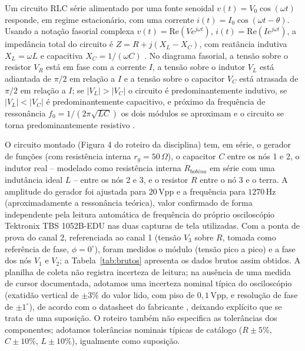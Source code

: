 \documentclass[12pt]{article}
\begin{document}
Um circuito RLC série alimentado por uma fonte senoidal $v(t)=V_0\cos(\omega t)$ responde, em regime estacionário, com uma corrente $i(t)=I_0\cos(\omega t-\theta)$. Usando a notação fasorial complexa $v(t)=\text{Re}(Ve^{j\omega t})$, $i(t)=\text{Re}(Ie^{j\omega t})$, a impedância total do circuito é $Z=R+j(X_L-X_C)$, com reatância indutiva $X_L=\omega L$ e capacitiva $X_C=1/(\omega C)$ \cite{Nussenzveig1997,Halliday2013}. No diagrama fasorial, a tensão sobre o resistor $V_R$ está em fase com a corrente $I$, a tensão sobre o indutor $V_L$ está adiantada de $\pi/2$ em relação a $I$ e a tensão sobre o capacitor $V_C$ está atrasada de $\pi/2$ em relação a $I$; se $|V_L|>|V_C|$ o circuito é predominantemente indutivo, se $|V_L|<|V_C|$ é predominantemente capacitivo, e próximo da frequência de ressonância $f_0=1/(2\pi\sqrt{LC})$ os dois módulos se aproximam e o circuito se torna predominantemente resistivo \cite{Nussenzveig1997,Halliday2013}.

O circuito montado (Figura 4 do roteiro da disciplina) tem, em série, o gerador de funções (com resistência interna $r_g=50\,\Omega$), o capacitor $C$ entre os nós 1 e 2, o indutor real -- modelado como resistência interna $R_{bobina}$ em série com uma indutância ideal $L$ -- entre os nós 2 e 3, e o resistor $R$ entre o nó 3 e o terra. A amplitude do gerador foi ajustada para $20\,\text{Vpp}$ e a frequência para $1270\,\text{Hz}$ (aproximadamente a ressonância teórica), valor confirmado de forma independente pela leitura automática de frequência do próprio osciloscópio Tektronix TBS 1052B-EDU nas duas capturas de tela utilizadas. Com a ponta de prova do canal 2, referenciada ao canal 1 (tensão $V_3$ sobre $R$, tomada como referência de fase, $\phi=0^\circ$), foram medidos o módulo (tensão pico a pico) e a fase dos nós $V_1$ e $V_2$; a Tabela~\ref{tab:brutos} apresenta os dados brutos assim obtidos. A planilha de coleta não registra incerteza de leitura; na ausência de uma medida de cursor documentada, adotamos uma incerteza nominal típica do osciloscópio (exatidão vertical de $\pm3\%$ do valor lido, com piso de $0{,}1\,\text{Vpp}$, e resolução de fase de $\pm1^\circ$), de acordo com o datasheet do fabricante \cite{Tektronix2016}, deixando explícito que se trata de uma suposição. O roteiro também não especifica as tolerâncias dos componentes; adotamos tolerâncias nominais típicas de catálogo ($R\pm5\%$, $C\pm10\%$, $L\pm10\%$), igualmente como suposição.
\end{document}
